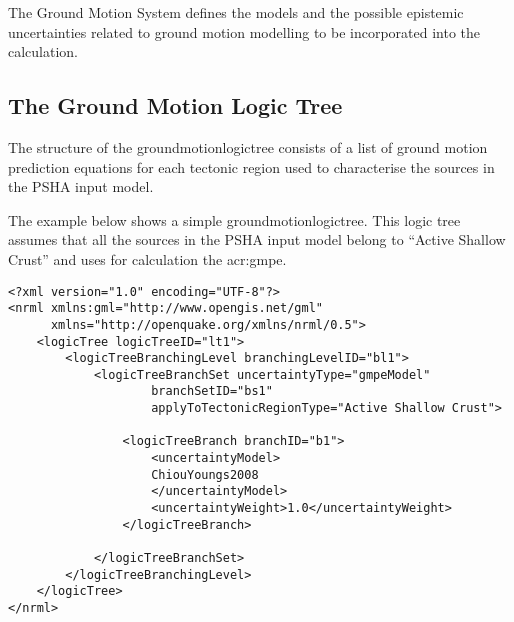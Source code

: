 The Ground Motion System defines the models and the possible epistemic
uncertainties related to ground motion modelling to be incorporated into the
calculation.

\subsection{The Ground Motion Logic Tree}
\label{subsec:gmlt}

The structure of the \gls{groundmotionlogictree} consists of a list of ground
motion prediction equations for each tectonic region used to characterise the
sources in the PSHA input model.

The example below shows a simple \gls{groundmotionlogictree}. This logic tree
assumes that all the sources in the PSHA input model belong to ``Active
Shallow Crust'' and uses for calculation the \citet{chiou2008}
\gls{acr:gmpe}.

\begin{verbatim}
<?xml version="1.0" encoding="UTF-8"?>
<nrml xmlns:gml="http://www.opengis.net/gml"
      xmlns="http://openquake.org/xmlns/nrml/0.5">
    <logicTree logicTreeID="lt1">
        <logicTreeBranchingLevel branchingLevelID="bl1">
            <logicTreeBranchSet uncertaintyType="gmpeModel"
                    branchSetID="bs1"
                    applyToTectonicRegionType="Active Shallow Crust">

                <logicTreeBranch branchID="b1">
                    <uncertaintyModel>
                    ChiouYoungs2008
                    </uncertaintyModel>
                    <uncertaintyWeight>1.0</uncertaintyWeight>
                </logicTreeBranch>

            </logicTreeBranchSet>
        </logicTreeBranchingLevel>
    </logicTree>
</nrml>
\end{verbatim}
%
